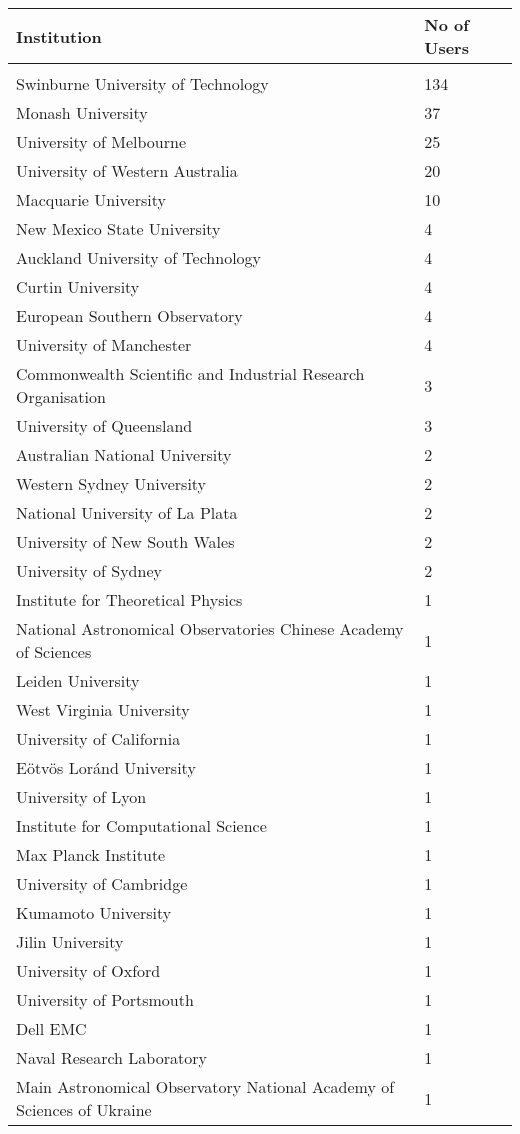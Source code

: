 \documentclass{article}%
\begin{document}
%
\begin{longtabu}{X[l] X[r]}%
\textbf{Institution}&\textbf{No of Users}\\%
\hline%
&\\%
Swinburne University of Technology&134\\%
\hline%
Monash University&37\\%
\hline%
University of Melbourne&25\\%
\hline%
University of Western Australia&20\\%
\hline%
Macquarie University&10\\%
\hline%
New Mexico State University&4\\%
\hline%
Auckland University of Technology&4\\%
\hline%
Curtin University&4\\%
\hline%
European Southern Observatory&4\\%
\hline%
University of Manchester&4\\%
\hline%
Commonwealth Scientific and Industrial Research Organisation&3\\%
\hline%
University of Queensland&3\\%
\hline%
Australian National University&2\\%
\hline%
Western Sydney University&2\\%
\hline%
National University of La Plata&2\\%
\hline%
University of New South Wales&2\\%
\hline%
University of Sydney&2\\%
\hline%
Institute for Theoretical Physics&1\\%
\hline%
National Astronomical Observatories Chinese Academy of Sciences&1\\%
\hline%
Leiden University&1\\%
\hline%
West Virginia University&1\\%
\hline%
University of California&1\\%
\hline%
Eötvös Loránd University&1\\%
\hline%
University of Lyon&1\\%
\hline%
Institute for Computational Science&1\\%
\hline%
Max Planck Institute&1\\%
\hline%
University of Cambridge&1\\%
\hline%
Kumamoto University&1\\%
\hline%
Jilin University&1\\%
\hline%
University of Oxford&1\\%
\hline%
University of Portsmouth&1\\%
\hline%
Dell EMC&1\\%
\hline%
Naval Research Laboratory&1\\%
\hline%
Main Astronomical Observatory National Academy of Sciences of Ukraine&1\\%
\hline%
\end{longtabu}%
\end{document}
